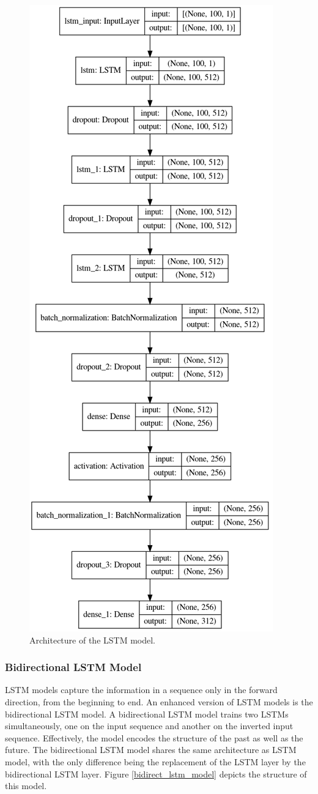 \documentclass[sigconf,authorversion]{acmart}
\begin{document}
\begin{figure}[h]
  \centering
  \includegraphics[width=0.6\linewidth]{lstm_model.png}
  \caption{Architecture of the LSTM model.}
  \label{lstm_model}
\end{figure}

\subsubsection{Bidirectional LSTM Model}

LSTM models capture the information in a sequence only in the forward direction,
from the beginning to end. An enhanced version of LSTM models is the bidirectional 
LSTM model. A bidirectional LSTM model trains two LSTMs simultaneously, one on the 
input sequence and another on the inverted input sequence. Effectively, the model 
encodes the structure of the past as well as the future. The bidirectional LSTM
model shares the same architecture as LSTM model, with the only difference being
the replacement of the LSTM layer by the bidirectional LSTM layer. Figure 
\ref{bidirect_lstm_model} depicts the structure of this model.
\end{document}
